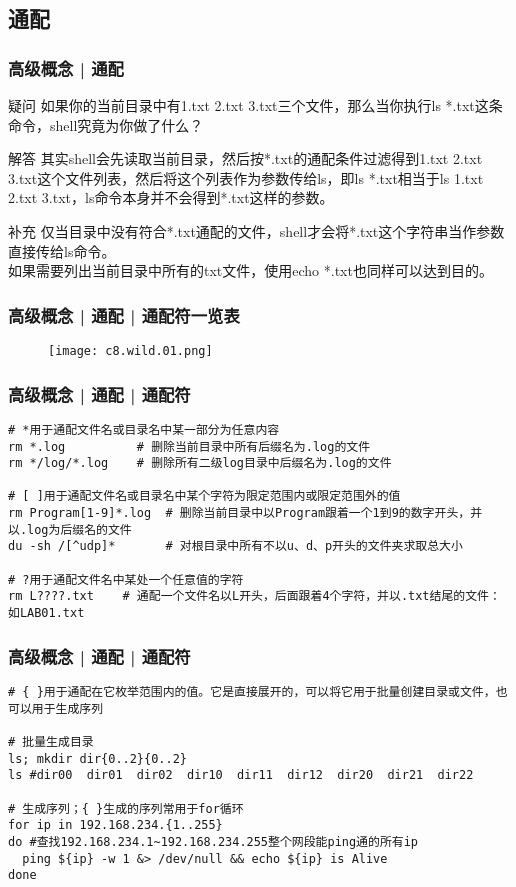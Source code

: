 \subsection{通配}
\begin{frame}
  \frametitle{高级概念 | 通配}
  \begin{block}{疑问}
    如果你的当前目录中有1.txt 2.txt 3.txt三个文件，那么当你执行ls *.txt这条命令，shell究竟为你做了什么？
  \end{block}
  \pause
  \begin{block}{解答}
    其实shell会先读取当前目录，然后按*.txt的通配条件过滤得到1.txt 2.txt 3.txt这个文件列表，然后将这个列表作为参数传给ls，即ls *.txt相当于ls 1.txt 2.txt 3.txt，ls命令本身并不会得到*.txt这样的参数。
  \end{block}
  \pause
  \begin{block}{补充}
    仅当目录中没有符合*.txt通配的文件，shell才会将*.txt这个字符串当作参数直接传给ls命令。\\
    如果需要列出当前目录中所有的txt文件，使用echo *.txt也同样可以达到目的。
  \end{block}
\end{frame}

\begin{frame}
  \frametitle{高级概念 | 通配 | 通配符一览表}
  \begin{figure}
    \centering
    \texttt{[image: c8.wild.01.png]}
  \end{figure}
\end{frame}

\begin{frame}[fragile]
  \frametitle{高级概念 | 通配 | 通配符}
\begin{lstlisting}
# *用于通配文件名或目录名中某一部分为任意内容
rm *.log          # 删除当前目录中所有后缀名为.log的文件
rm */log/*.log    # 删除所有二级log目录中后缀名为.log的文件

# [ ]用于通配文件名或目录名中某个字符为限定范围内或限定范围外的值
rm Program[1-9]*.log  # 删除当前目录中以Program跟着一个1到9的数字开头，并以.log为后缀名的文件
du -sh /[^udp]*       # 对根目录中所有不以u、d、p开头的文件夹求取总大小

# ?用于通配文件名中某处一个任意值的字符
rm L????.txt    # 通配一个文件名以L开头，后面跟着4个字符，并以.txt结尾的文件：如LAB01.txt
\end{lstlisting}
\end{frame}

\begin{frame}[fragile]
  \frametitle{高级概念 | 通配 | 通配符}
\begin{lstlisting}
# { }用于通配在它枚举范围内的值。它是直接展开的，可以将它用于批量创建目录或文件，也可以用于生成序列

# 批量生成目录
ls; mkdir dir{0..2}{0..2}    
ls #dir00  dir01  dir02  dir10  dir11  dir12  dir20  dir21  dir22

# 生成序列；{ }生成的序列常用于for循环
for ip in 192.168.234.{1..255}
do #查找192.168.234.1~192.168.234.255整个网段能ping通的所有ip
  ping ${ip} -w 1 &> /dev/null && echo ${ip} is Alive
done
\end{lstlisting}
\end{frame}

